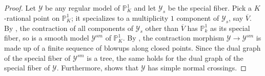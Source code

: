 \documentclass[12pt]{amsart}
\numberwithin{equation}{section}
\theoremstyle{definition}
\newcommand{\connor}[1]{{\color{Orange} \sf $\diamondsuit\diamondsuit\diamondsuit$ Connor: [#1]}}
\newcommand{\ol}[1]{\overline{#1}}
\newcommand{\mc}[1]{\mathcal{#1}}
\newcommand{\proj}{\mathbb P}
\newcommand{\Y}{\mathcal{Y}}
\begin{document}
\begin{proof}

Let $\mc{Y}$ be any regular model of $\proj^1_K$ and let 
$\mc{Y}_s$ be the special fiber. Pick a $K$-rational point on $\proj^1_K$; it specializes to a
multiplicity $1$ component of $\mc{Y}_s$, say $\ol{V}$.  By
\cite[Lemma~7.1]{ObusWewers}, the
contraction of all components of $\mc{Y}_s$ other than $\ol{V}$ has
$\proj^1_k$ as its special fiber, so is a
smooth model $\mc{Y}^{sm}$ of $\proj^1_K$.  By
\cite[Theorem~9.2.2]{Liubook}, the contraction morphism $\mc{Y} \to
\mc{Y}^{sm}$ is made up of a finite sequence of blowups along closed
points.  Since the dual graph of the special fiber of $\mc{Y}^{sm}$
is a tree, the same holds for the dual graph of the special fiber of
$\mc{Y}$.  Furthermore, \cite[Lemma~9.2.31]{Liubook} shows that
$\mc{Y}$ has simple normal crossings.
\end{proof}
\end{document}
